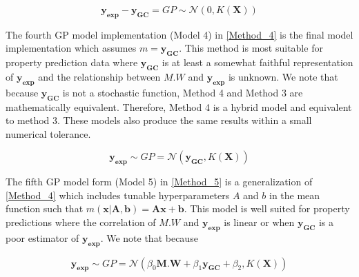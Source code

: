 \documentclass[journal=jacsat,manuscript=article]{achemso}
\begin{document}
\begin{equation}
    \mathbf{y_{\text{exp}}} - \mathbf{y_{GC}} = GP \sim \mathcal{N}\left(0, K(\mathbf{X}) \right)
    \label{Method_3}
\end{equation}

The fourth GP model implementation (Model 4) in \eqref{Method_4} is the final model implementation which assumes $m = \mathbf{y_{GC}}$. This method is most suitable for property prediction data where $\mathbf{y_{GC}}$ is at least a somewhat faithful representation of $\mathbf{y_{\text{exp}}}$ and the relationship between $M.W$ and $\mathbf{y_{\text{exp}}}$ is unknown. We note that because $\mathbf{y_{GC}}$ is not a stochastic function, Method 4 and Method 3 are mathematically equivalent. Therefore, Method 4 is a hybrid model and equivalent to method 3. These models also produce the same results within a small numerical tolerance. 

\begin{equation}
    \mathbf{y_{\text{exp}}} \sim  GP = \mathcal{N}\left(\mathbf{y_{GC}}, K(\mathbf{X}) \right)
    \label{Method_4}
\end{equation}

The fifth GP model form (Model 5) in \eqref{Method_5} is a generalization of \eqref{Method_4} which includes tunable hyperparameters $A$ and $b$ in the mean function such that $m(\mathbf{x} \vert \mathbf{A},\mathbf{b}) = \mathbf{A}\mathbf{x} + \mathbf{b}$. This model is well suited for property predictions where the correlation of $M.W$ and $\mathbf{y_{\text{exp}}}$ is linear or when $\mathbf{y_{GC}}$ is a poor estimator of $\mathbf{y_{\text{exp}}}$. We note that because 

\begin{equation}
    \mathbf{y_{\text{exp}}} \sim GP = \mathcal{N}\left( \beta_{0} \mathbf{M.W} + \beta_{1} \mathbf{y_{GC}} +\beta_{2} , K(\mathbf{X}) \right)
    \label{Method_5}
\end{equation}


\end{document}
